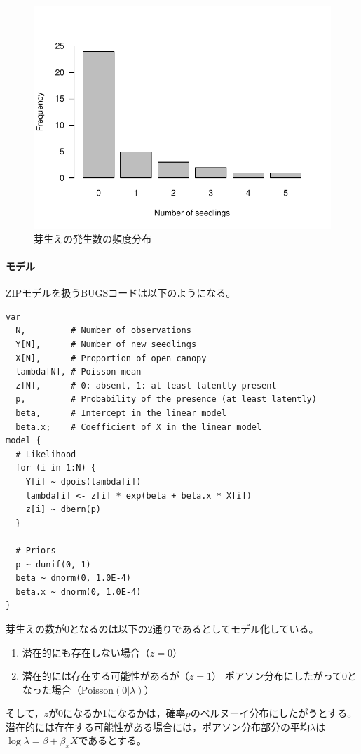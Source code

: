 \documentclass[11pt,uplatex]{jsarticle}
\begin{document}
\begin{figure}[hbtp]
  \begin{center}
    \includegraphics[bb=0 0 360 270, clip, width=300 bp]{example4_barplot.pdf}
  \end{center}
  \caption{芽生えの発生数の頻度分布}
  \label{example4_barplot}
\end{figure}


\paragraph{モデル}
ZIPモデルを扱うBUGSコードは以下のようになる。

\begin{lstlisting}
var
  N,         # Number of observations
  Y[N],      # Number of new seedlings
  X[N],      # Proportion of open canopy
  lambda[N], # Poisson mean
  z[N],      # 0: absent, 1: at least latently present
  p,         # Probability of the presence (at least latently)
  beta,      # Intercept in the linear model
  beta.x;    # Coefficient of X in the linear model
model {
  # Likelihood
  for (i in 1:N) {
    Y[i] ~ dpois(lambda[i])
    lambda[i] <- z[i] * exp(beta + beta.x * X[i])
    z[i] ~ dbern(p)
  }

  # Priors
  p ~ dunif(0, 1)
  beta ~ dnorm(0, 1.0E-4)
  beta.x ~ dnorm(0, 1.0E-4)
}
\end{lstlisting}


芽生えの数が0となるのは以下の2通りであるとしてモデル化している。
\begin{enumerate}
\item 潜在的にも存在しない場合（$z=0$）
\item 潜在的には存在する可能性があるが（$z=1$）
ポアソン分布にしたがって0となった場合（$\mathrm{Poisson}(0|\lambda)$）
\end{enumerate}
そして，$z$が0になるか1になるかは，確率$p$のベルヌーイ分布にしたがうとする。
潜在的には存在する可能性がある場合には，ポアソン分布部分の平均$\lambda$は
$\log\lambda = \beta + \beta_{x}X$であるとする。
\end{document}
